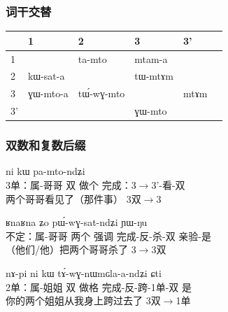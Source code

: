 \documentclass[xcolor=table]{beamer}
\newcommand{\ipa}[1]{{\phon \mbox{#1}}} %
\newcommand{\grise}[1]{\cellcolor{lightgray}\textbf{#1}}
\newcommand{\bleu}[1]{{\color{blue}#1}}
\newcommand{\rouge}[1]{{\color{red}#1}}
\newcommand{\marque}[1]{\color{blue}#1}
\begin{document}
          
 \begin{frame} 
 \frametitle{词干交替}      
     
     \centering
 \begin{tabular}{llllll}
&     1 & 2 & 3 &3'\\
\toprule
 1 &\grise{} &\ipa{ta-mto} & \ipa{\bleu{mtam}-a}\\  
 2 &\ipa{kɯ-sat-a}&\grise{}  &  \ipa{tɯ-\bleu{mtɤm}}\\  
 3 & \ipa{\rouge{ɣɯ}-mto-a}&  \ipa{tɯ́-\rouge{wɣ}-mto}&\grise{}   &\ipa{\bleu{mtɤm}} \\
  3'&  &&  \ipa{\rouge{ɣɯ}-mto}\\
  \bottomrule
\end{tabular}
     
\end{frame}    

    \begin{frame} 
 \frametitle{双数和复数后缀}      

\begin{exe}
\ex 
\gll \ipa{ɯ-pi} 	\ipa{ni} 	\ipa{kɯ} 	\ipa{pa-mto-ndʑi}  \\
3单：属-哥哥 双 做个 完成：3$\rightarrow$3'-看-双 \\
\glt 两个哥哥看见了（那件事） \marque{3双$\rightarrow$3}
\end{exe}

\begin{exe}
\ex 
\gll \ipa{tɤ-pi} 	\ipa{ʁnaʁna} 	\ipa{ʑo} 	\ipa{pɯ́-wɣ-sat-ndʑi} 	\ipa{ɲɯ-ŋu} \\
不定：属-哥哥 两个 强调 完成-反-杀-双 亲验-是 \\
\glt （他们/他）把两个哥哥杀了 \marque{3$\rightarrow$3双}
\end{exe}

\begin{exe}
\ex 
\gll
\ipa{nɤ-pi} 	\ipa{ni} 	\ipa{kɯ} 	\ipa{tɤ́-wɣ-nɯmɢla-a-ndʑi} 	\ipa{ɕti} \\
2单：属-姐姐 双 做格 完成-反-跨-1单-双 是 \\
\glt 你的两个姐姐从我身上跨过去了 \marque{3双$\rightarrow$1单}
\end{exe}


\end{frame}    
\end{document}
